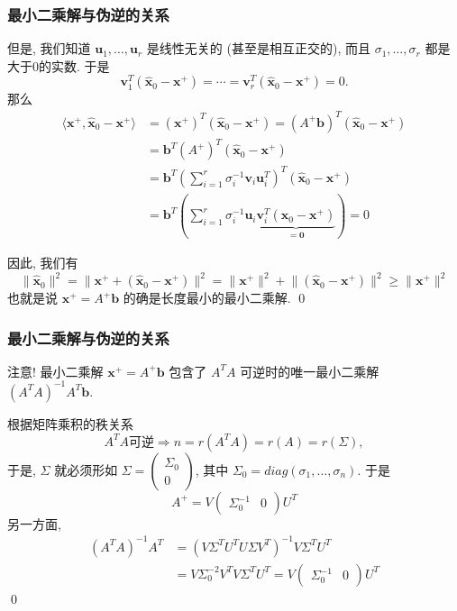\begin{frame}
\frametitle{最小二乘解与伪逆的关系}

但是, 我们知道 $\mathbf{u}_1,\ldots,\mathbf{u}_r$ 是线性无关的 (甚至是相互正交的), 而且 $\sigma_1,\ldots,\sigma_r$ 都是大于0的实数. 于是
\[\mathbf{v}_1^T (\widehat{\mathbf{x}}_0-\mathbf{x}^+) = \cdots = \mathbf{v}_r^T (\widehat{\mathbf{x}}_0-\mathbf{x}^+) = 0.\]
那么
\begin{align*}
\langle \mathbf{x}^+, \widehat{\mathbf{x}}_0 - \mathbf{x}^+ \rangle & = (\mathbf{x}^+)^T (\widehat{\mathbf{x}}_0 - \mathbf{x}^+) = (A^+\mathbf{b})^T (\widehat{\mathbf{x}}_0 - \mathbf{x}^+) \\
& = \mathbf{b}^T (A^+)^T (\widehat{\mathbf{x}}_0 - \mathbf{x}^+) \\
& = \mathbf{b}^T \left( \sum\limits_{i=1}^r \sigma_i^{-1} \mathbf{v}_i \mathbf{u}_i^T \right)^T (\widehat{\mathbf{x}}_0 - \mathbf{x}^+) \\
& = \mathbf{b}^T \left( \sum\limits_{i=1}^r \sigma_i^{-1} \mathbf{u}_i \underbrace{\mathbf{v}_i^T (\widehat{\mathbf{x}}_0 - \mathbf{x}^+)}_{=\mathbf{0}} \right) = 0
\end{align*}

因此, 我们有
\[\lVert \widehat{\mathbf{x}}_0 \rVert^2 = \lVert \mathbf{x}^+ + (\widehat{\mathbf{x}}_0 - \mathbf{x}^+) \rVert^2 = \lVert \mathbf{x}^+ \rVert^2 + \lVert (\widehat{\mathbf{x}}_0 - \mathbf{x}^+) \rVert^2 \geqslant \lVert \mathbf{x}^+ \rVert^2\]
也就是说 $\mathbf{x}^+ = A^+\mathbf{b}$ 的确是长度最小的最小二乘解.
\qed

\end{frame}


\begin{frame}
\frametitle{最小二乘解与伪逆的关系}

\begin{remark}
{\color{red}注意}! 最小二乘解 $\mathbf{x}^+ = A^+\mathbf{b}$ 包含了 $A^TA$ 可逆时的唯一最小二乘解 $(A^TA)^{-1}A^T\mathbf{b}$.
\end{remark}

\vspace{1em}
\pause

\startproof[bg=yellow, fg=red]
根据矩阵乘积的秩关系
\[A^TA\text{可逆} \Longrightarrow n = r(A^TA) = r(A) = r(\Sigma),\]
于是, $\Sigma$ 就必须形如 $\Sigma = \begin{pmatrix} \Sigma_0 \\ 0 \end{pmatrix}$, 其中 $\Sigma_0 = diag(\sigma_1, \ldots, \sigma_n)$. 于是
\[A^+ = V\begin{pmatrix} \Sigma_0^{-1} & 0 \end{pmatrix} U^T\]
另一方面,
\begin{align*}
(A^TA)^{-1}A^T & = (V\Sigma^TU^TU\Sigma V^T)^{-1} V\Sigma^TU^T \\
& = V \Sigma_0^{-2} V^T V\Sigma^TU^T = V\begin{pmatrix} \Sigma_0^{-1} & 0 \end{pmatrix} U^T
\end{align*}
\qed

\end{frame}

